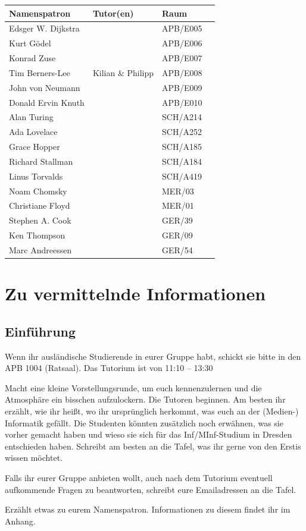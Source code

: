 \documentclass[a4paper,12pt]{report}
\begin{document}
\begin{center}
\vspace{1cm}
\begin{tabular}[h]{|l|l|l|l|}
	\hline
	\textbf{Namenspatron} & \textbf{Tutor(en)} & \textbf{Raum}\\ \hline
	Edsger W. Dijkstra & & APB/E005\\
	Kurt Gödel & & APB/E006\\
	Konrad Zuse & & APB/E007\\
	Tim Berners-Lee & Kilian \& Philipp & APB/E008\\
	John von Neumann & & APB/E009\\
	Donald Ervin Knuth & & APB/E010\\
	Alan Turing & & SCH/A214\\
	Ada Lovelace & & SCH/A252\\
	Grace Hopper & & SCH/A185\\
	Richard Stallman & & SCH/A184\\
	Linus Torvalds & & SCH/A419\\
	Noam Chomsky & & MER/03\\
	Christiane Floyd & & MER/01\\
	Stephen A. Cook & & GER/39\\
	Ken Thompson & & GER/09\\
	Marc Andreessen & & GER/54\\
	\hline
\end{tabular}
\end{center}

\chapter{Zu vermittelnde Informationen}

\section{Einführung}
\begin{itemize*}
\item Wenn ihr ausländische Studierende in eurer Gruppe habt, schickt sie bitte in den APB 1004 (Ratsaal). Das Tutorium ist von 11:10 – 13:30\\
\item Macht eine kleine Vorstellungsrunde, um euch kennenzulernen und die Atmosphäre ein bisschen aufzulockern.
Die Tutoren beginnen.
Am besten ihr erzählt, wie ihr heißt, wo ihr ursprünglich herkommt, was euch an der (Medien-) Informatik gefällt.
Die Studenten könnten zusätzlich noch erwähnen, was sie vorher gemacht haben und wieso sie sich für das Inf/MInf-Studium in Dresden entschieden haben.
Schreibt am besten an die Tafel, was ihr gerne von den Erstis wissen möchtet.
\item Falls ihr eurer Gruppe anbieten wollt, auch nach dem Tutorium eventuell aufkommende Fragen zu beantworten, schreibt eure Emailadressen an die Tafel.
\item Erzählt etwas zu eurem Namenspatron. Informationen zu diesem findet ihr im Anhang.
\end{itemize*}
\end{document}
